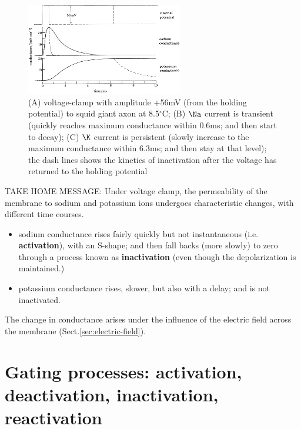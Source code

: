 \begin{figure}[hbt]
  \centerline{\includegraphics[height=4cm,
    angle=0]{./images/persistent-K-transient-Na.eps}}
  \caption{(A) voltage-clamp with amplitude +56mV (from the holding potential)
  to squid giant axon at 8.5$^\circ$C; (B) $\Na$ current is transient (quickly
  reaches maximum conductance within 0.6ms; and then start to decay); (C) $\K$
  current is persistent (slowly increase to the maximum conductance within
  6.3ms; and then stay at that level); the dash lines shows the kinetics of
  inactivation after the voltage has returned to the holding potential}
\label{fig:persistent-K-transient-Na}
\end{figure}


TAKE HOME MESSAGE: Under voltage clamp, the permeability of the membrane to
sodium and potassium ions undergoes characteristic changes, with different time
courses.
\begin{itemize}
  
  \item sodium conductance rises fairly quickly but not instantaneous (i.e. {\bf
  activation}), with an S-shape; and then fall backs (more slowly) to zero
  through a process known as {\bf inactivation} (even though the depolarization
  is maintained.)
  
  \item potassium conductance rises, slower, but also with a delay; and is not
  inactivated.
  
\end{itemize}
The change in conductance arises under the influence of the electric field
across the membrane (Sect.\ref{sec:electric-field}).


\section{Gating processes: activation, deactivation, inactivation, reactivation}
\label{sec:gating-variables}

\def\deactivation{{\textcolor{red}{deactivation}}}
\def\inactivation{{\textcolor{red}{inactivation}}}
\def\reactivation{{\textcolor{red}{reactivation}}}
\def\activation{{\textcolor{red}{activation}}}

